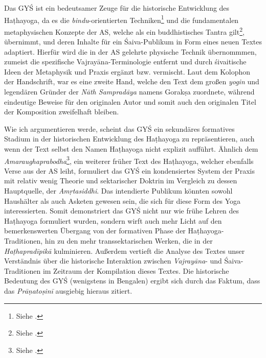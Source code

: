 \documentclass[a4paper,12pt]{article}
\begin{document}
Das GYŚ ist ein bedeutsamer Zeuge für die historische Entwicklung des Haṭhayoga, da es die \textit{bindu}-orientierten Techniken\footnote{Siehe \parencite{mallinson2012hatha}.} und die fundamentalen metaphysischen Konzepte der AS, welche als ein buddhistisches Tantra gilt\footnote{Siehe \parencite{mallinson2016as}.}, übernimmt, und deren Inhalte für ein Śaiva-Publikum in Form eines neuen Textes adaptiert. Hierfür wird die in der AS gelehrte physische Technik übernommmen, zumeist die spezifische Vajrayāna-Terminologie entfernt und durch śivaitische Ideen der Metaphysik und Praxis ergänzt bzw. vermischt. Laut dem Kolophon der Handschrift, war es eine zweite Hand, welche den Text dem großen \textit{yogin} und legendären Gründer der \textit{Nāth Sampradāya} namens Gorakṣa zuordnete, während eindeutige Beweise für den originalen Autor und somit auch den originalen Titel der Komposition zweifelhaft bleiben.
 
Wie ich argumentieren werde, scheint das GYŚ ein sekundäres formatives Stadium in der historischen Entwicklung des Haṭhayoga zu repräsentieren, auch wenn der Text selbst den Namen Haṭhayoga nicht explizit aufführt. Ähnlich dem \textit{Amaraughaprabodha}\footnote{Siehe \parencite[1]{birch2019}.}, ein weiterer früher Text des Haṭhayoga, welcher ebenfalls Verse aus der AS leiht, formuliert das GYŚ ein kondensiertes System der Praxis mit relativ wenig Theorie und sektarischer Doktrin im Vergleich zu dessen Hauptquelle, der \textit{Amṛtasiddhi}. Das intendierte Publikum könnten sowohl Haushälter als auch Asketen gewesen sein, die sich für diese Form des Yoga interessierten. Somit demonstriert das GYŚ nicht nur wie frühe Lehren des Haṭhayoga formuliert wurden, sondern wirft auch mehr Licht auf den bemerkenswerten Übergang von der formativen Phase der Haṭhayoga-Traditionen, hin zu den mehr transsektarischen Werken, die in der \textit{Haṭhapradīpikā} kulminieren. Außerdem vertieft die Analyse des Textes unser Verständnis über die historische Interaktion zwischen \textit{Vajrayāna}- und Śaiva-Traditionen im Zeitraum der Kompilation dieses Textes. Die historische Bedeutung des GYŚ (wenigstens in Bengalen) ergibt sich durch das Faktum, dass das \textit{Prāṇatoṣinī} ausgiebig hieraus zitiert.
\end{document}
